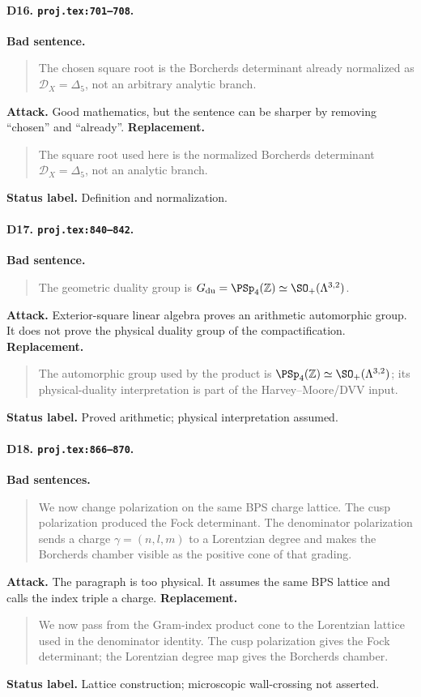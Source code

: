 \paragraph{D16. \texttt{proj.tex:701--708}.}
\textbf{Bad sentence.}
\begin{quote}\small
The chosen square root is the Borcherds determinant already normalized as
\(\mathcal D_X=\Delta_5\), not an arbitrary analytic branch.
\end{quote}
\textbf{Attack.}
Good mathematics, but the sentence can be sharper by removing ``chosen''
and ``already''.
\textbf{Replacement.}
\begin{quote}\small
The square root used here is the normalized Borcherds determinant
\(\mathcal D_X=\Delta_5\), not an analytic branch.
\end{quote}
\textbf{Status label.} Definition and normalization.

\paragraph{D17. \texttt{proj.tex:840--842}.}
\textbf{Bad sentence.}
\begin{quote}\small
The geometric duality group is
\(G_{\mathrm{du}}=\PSp_4(\mathbb Z)\simeq\SO_+(\Lambda^{3,2})\).
\end{quote}
\textbf{Attack.}
Exterior-square linear algebra proves an arithmetic automorphic group.
It does not prove the physical duality group of the compactification.
\textbf{Replacement.}
\begin{quote}\small
The automorphic group used by the product is
\(\PSp_4(\mathbb Z)\simeq\SO_+(\Lambda^{3,2})\); its physical-duality
interpretation is part of the Harvey--Moore/DVV input.
\end{quote}
\textbf{Status label.} Proved arithmetic; physical interpretation
assumed.

\paragraph{D18. \texttt{proj.tex:866--870}.}
\textbf{Bad sentences.}
\begin{quote}\small
We now change polarization on the same BPS charge lattice.  The cusp
polarization produced the Fock determinant.  The denominator
polarization sends a charge \(\gamma=(n,l,m)\) to a Lorentzian degree
and makes the Borcherds chamber visible as the positive cone of that
grading.
\end{quote}
\textbf{Attack.}
The paragraph is too physical.  It assumes the same BPS lattice and calls
the index triple a charge.
\textbf{Replacement.}
\begin{quote}\small
We now pass from the Gram-index product cone to the Lorentzian lattice
used in the denominator identity.  The cusp polarization gives the Fock
determinant; the Lorentzian degree map gives the Borcherds chamber.
\end{quote}
\textbf{Status label.} Lattice construction; microscopic wall-crossing
not asserted.

